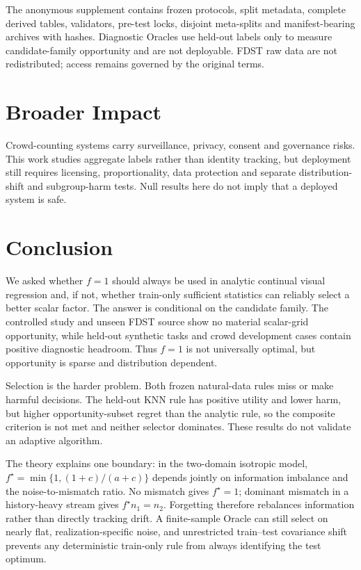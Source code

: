 \documentclass[10pt]{article}
\begin{document}
The anonymous supplement contains frozen protocols, split metadata, complete
derived tables, validators, pre-test locks, disjoint meta-splits and
manifest-bearing archives with hashes.  Diagnostic Oracles use held-out labels
only to measure candidate-family opportunity and are not deployable.  FDST raw
data are not redistributed; access remains governed by the original terms.

\section{Broader Impact}
\label{sec:broader-impact}

Crowd-counting systems carry surveillance, privacy, consent and governance
risks.  This work studies aggregate labels rather than identity tracking, but
deployment still requires licensing, proportionality, data protection and
separate distribution-shift and subgroup-harm tests.  Null results here do not
imply that a deployed system is safe.

\section{Conclusion}
\label{sec:conclusion}

We asked whether $f=1$ should always be used in analytic continual visual
regression and, if not, whether train-only sufficient statistics can reliably
select a better scalar factor.  The answer is conditional on the candidate
family.  The controlled study and unseen FDST source show no material
scalar-grid opportunity, while held-out synthetic tasks and crowd development
cases contain positive diagnostic headroom.  Thus $f=1$ is not universally
optimal, but opportunity is sparse and distribution dependent.

Selection is the harder problem.  Both frozen natural-data rules miss or make
harmful decisions.  The held-out KNN rule has positive utility and lower harm,
but higher opportunity-subset regret than the analytic rule, so the composite
criterion is not met and neither selector dominates.  These results do not
validate an adaptive algorithm.

The theory explains one boundary: in the two-domain isotropic model,
$f^\star=\min\{1,(1+c)/(a+c)\}$ depends jointly on information imbalance and
the noise-to-mismatch ratio.  No mismatch gives $f^\star=1$; dominant
mismatch in a history-heavy stream gives $f^\star n_1=n_2$.  Forgetting
therefore rebalances information rather than directly tracking drift.  A
finite-sample Oracle can still select on nearly flat, realization-specific
noise, and unrestricted train--test covariance shift prevents any deterministic
train-only rule from always identifying the test optimum.
\end{document}
